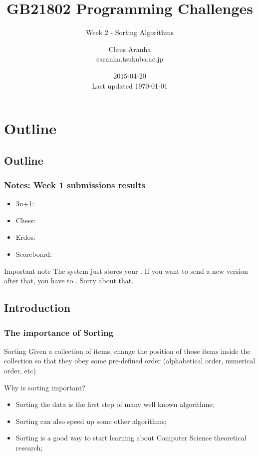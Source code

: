 \documentclass{beamer}
\title[]{GB21802 Programming Challenges}
\subtitle[]{Week 2 - Sorting Algorithms}
\author[Claus Aranha]{Claus Aranha\\{\footnotesize caranha\@@cs.tsukuba.ac.jp}}
\institute{College of Information Sciences}
\date{2015-04-20\\{\tiny Last updated \today}}
\begin{document}
\section{Outline}
\subsection{Outline}

\begin{frame}
\maketitle
\end{frame}

\begin{frame}
  \frametitle{Notes: Week 1 submissions results}
  \begin{itemize}
    \item 3n+1:
    \item Chess:
    \item Erdos:
    \item Scoreboard:
  \end{itemize}

  \begin{alertblock}{Important note}
    The system just stores your . If
    you want to send a new version after that, you have to
    . Sorry about that.
  \end{alertblock}
\end{frame}

\subsection{Introduction}

\begin{frame}
  \frametitle{The importance of Sorting}
  \begin{block}{Sorting}
    Given a collection of items, change the position of those items
    inside the collection so that they obey some pre-defined order
    (alphabetical order, numerical order, etc)
  \end{block}
  \vfill
  \begin{center}
    Why is sorting important?
  \end{center}
  \begin{itemize}
    \item Sorting the data is the first step of many well known
      algorithms;
    \item Sorting can also speed up some other algorithms;
    \item Sorting is a good way to start learning about Computer
      Science theoretical research;
  \end{itemize}

\end{frame}
\end{document}
